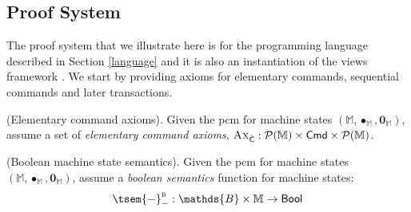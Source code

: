 \subsection{Proof System}

The proof system that we illustrate here is for the programming language described in Section \ref{language} and it is also an instantiation of the views framework \cite{views}. We start by providing axioms for elementary commands, sequential commands and later transactions.

\begin{param}
	(Elementary command axioms).
	Given the pcm for machine states $(\mathbb{M}, \bullet_\mathbb{M}, \mathbf{0}_\mathbb{M})$, assume a set of \emph{elementary command axioms}, $\textsc{Ax}_{\hat{\mathsf{C}}} : \mathcal{P}(\mathbb{M}) \times \mathsf{Cmd} \times \mathcal{P}(\mathbb{M})$.
\end{param}

\begin{param}
	\label{param:boolMachine}
	(Boolean machine state semantics).
	Given the pcm for machine states $(\mathbb{M}, \bullet_\mathbb{M}, \mathbf{0}_\mathbb{M})$, assume a \emph{boolean semantics} function for machine states:
	\[
		\tsem{-}^\textsc{b}_- : \mathds{B} \times \mathbb{M} \rightarrow \mathsf{Bool}
	\]
\end{param}

